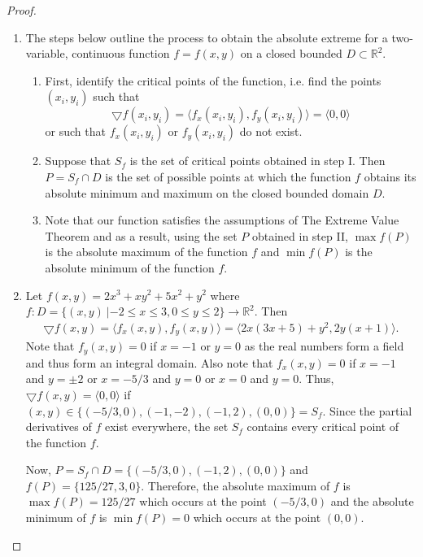 \documentclass[12pt]{article}
\theoremstyle{definition}
\begin{document}
\begin{proof}
  \begin{enumerate}
    \item The steps below outline the process to obtain the absolute extreme for
      a two-variable, continuous function $f = f(x, y)$ on a closed bounded $D \subset \mathbb{R}^2$.
      \begin{enumerate}[label=\Roman*.]
        \item First, identify the critical points of the function, i.e. find the points
          $(x_i, y_i)$ such that $$\bigtriangledown f(x_i, y_i) = \langle f_x(x_i, y_i), f_y(x_i, y_i) \rangle = \langle 0, 0 \rangle$$
          or such that $f_x(x_i, y_i)$ or $f_y(x_i, y_i)$ do not exist.
        \item Suppose that $S_f$ is the set of critical points obtained in step I. Then
          $P = S_f \cap D$ is the set of possible points at which
          the function $f$ obtains its absolute minimum and maximum on the closed bounded domain $D$.
        \item Note that our function satisfies
          the assumptions of The Extreme Value Theorem and as a result, using the set $P$ obtained in step II,
          $\max{f(P)}$ is the absolute maximum of the function $f$
          and $\min{f(P)}$ is the absolute minimum of the function $f$.
      \end{enumerate}
    \item Let $f(x, y) = 2x^3 + xy^2 + 5x^2 + y^2$ where $f: D = \{(x, y)\ | -2 \leq x \leq 3, 0 \leq y \leq 2\} \to \mathbb{R}^2$. Then
      \begin{align*}
        \bigtriangledown f(x, y) = \langle f_x(x, y), f_y(x, y) \rangle = \langle 2x(3x + 5) + y^2, 2y(x + 1)\rangle.
      \end{align*}
      Note that $f_y(x,y) = 0$ if $x = -1$ or $y = 0$ as the real numbers form a field and thus form an integral domain.
      Also note that $f_x(x, y) = 0$ if $x = -1$ and $y = \pm 2$ or $x = -5/3$ and $y = 0$ or $x = 0$ and $y = 0$. Thus,
      $\bigtriangledown f(x, y) = \langle 0, 0 \rangle$ if $(x, y) \in \{(-5/3, 0), (-1, -2), (-1, 2), (0, 0)\} = S_f$.  Since the partial derivatives
      of $f$ exist everywhere, the set $S_f$ contains every critical point of the function $f$.

      Now, $P = S_f \cap D = \{(-5/3, 0), (-1, 2), (0, 0)\}$ and $f(P) = \{125/27, 3, 0\}$. Therefore,
      the absolute maximum of $f$ is $\max{f(P)} = 125/27$ which occurs at the point $(-5/3, 0)$ and the absolute
      minimum of $f$ is $\min{f(P)} = 0$ which occurs at the point $(0, 0)$.
  \end{enumerate}
\end{proof}
\newpage
\end{document}
